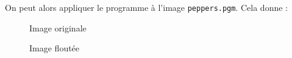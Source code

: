 \documentclass[french,a4paper,10pt]{article}
\begin{document}
    On peut alors appliquer le programme à l'image \texttt{peppers.pgm}.
    Cela donne :
    \begin{figure}[!htb]
        \begin{minipage}{0.48\textwidth}
            \centering
            \caption{Image originale}\label{Fig:peppers-grey-1}
        \end{minipage}\hfill
        \begin{minipage}{0.48\textwidth}
            \centering
            \caption{Image floutée}\label{Fig:peppers-grey-ff1}
        \end{minipage}
    \end{figure}
\end{document}
